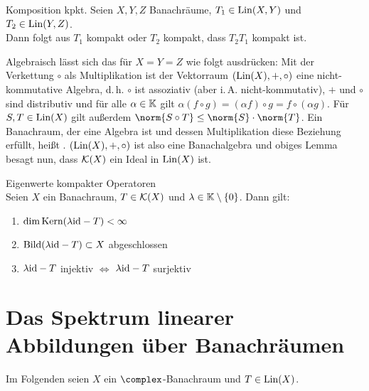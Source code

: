 \linie

\begin{Lemma}{Komposition kpkt.}
    Seien $X, Y, Z$ Banachräume, $T_1 \in \operatorname{Lin}(X, Y)$ und $T_2 \in \operatorname{Lin}(Y, Z)$.\\
    Dann folgt aus $T_1$ kompakt oder $T_2$ kompakt, dass $T_2 T_1$ kompakt ist.
\end{Lemma}

\begin{Bem}
    Algebraisch lässt sich das für $X = Y = Z$ wie folgt ausdrücken:
    Mit der Verkettung $\circ$ als Multiplikation ist der Vektorraum
    $(\operatorname{Lin}(X), +, \circ)$ eine nicht-kommutative Algebra,
    d.\,h. $\circ$ ist assoziativ (aber i.\,A. nicht-kommutativ),
    $+$ und $\circ$ sind distributiv und für alle $\alpha \in \mathbb{K}$ gilt
    $\alpha (f \circ g) = (\alpha f) \circ g = f \circ (\alpha g)$.
    Für $S, T \in \operatorname{Lin}(X)$ gilt außerdem $\norm{S \circ T} \le \norm{S} \cdot \norm{T}$.
    Ein Banachraum, der eine Algebra ist und dessen Multiplikation diese Beziehung erfüllt,
    heißt .
    $(\operatorname{Lin}(X), +, \circ)$ ist also eine Banachalgebra und obiges Lemma besagt nun,
    dass $\mathcal{K}(X)$ ein Ideal in $\operatorname{Lin}(X)$ ist.
\end{Bem}

\linie

\begin{Satz}{Eigenwerte kompakter Operatoren}\\
    Seien $X$ ein Banachraum, $T \in \mathcal{K}(X)$ und $\lambda \in \mathbb{K} \setminus \{0\}$.
    Dann gilt:
    \begin{enumerate}
        \item
        $\dim \text{Kern}(\lambda\text{id} - T) < \infty$

        \item
        $\text{Bild}(\lambda\text{id} - T) \subset X$ abgeschlossen

        \item
        $\lambda\text{id} - T$ injektiv $\iff$ $\lambda\text{id} - T$ surjektiv
    \end{enumerate}
\end{Satz}

\pagebreak

\section{%
    Das Spektrum linearer Abbildungen über Banachräumen%
}

\begin{Bem}
    Im Folgenden seien $X$ ein $\complex$-Banachraum und $T \in \operatorname{Lin}(X)$.
\end{Bem}

